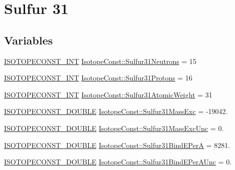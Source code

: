 \hypertarget{group___isotope_const-_sulfur-_s31}{}\section{Sulfur 31}
\label{group___isotope_const-_sulfur-_s31}
\subsection*{Variables}
\begin{DoxyCompactItemize}
\item 
\mbox{\hyperlink{group___isotope_const-_macros_ga5f18360b3e99483a35c32d789e62621c}{I\+S\+O\+T\+O\+P\+E\+C\+O\+N\+S\+T\+\_\+\+I\+NT}} \mbox{\hyperlink{group___isotope_const-_sulfur-_s31_ga2a333a718f9a0844678a067ed7ea4012}{Isotope\+Const\+::\+Sulfur31\+Neutrons}} = 15
\item 
\mbox{\hyperlink{group___isotope_const-_macros_ga5f18360b3e99483a35c32d789e62621c}{I\+S\+O\+T\+O\+P\+E\+C\+O\+N\+S\+T\+\_\+\+I\+NT}} \mbox{\hyperlink{group___isotope_const-_sulfur-_s31_ga25b464d32176264ada3a34dad01cb6b0}{Isotope\+Const\+::\+Sulfur31\+Protons}} = 16
\item 
\mbox{\hyperlink{group___isotope_const-_macros_ga5f18360b3e99483a35c32d789e62621c}{I\+S\+O\+T\+O\+P\+E\+C\+O\+N\+S\+T\+\_\+\+I\+NT}} \mbox{\hyperlink{group___isotope_const-_sulfur-_s31_ga4233eee92ca51082de80652bed9cea7c}{Isotope\+Const\+::\+Sulfur31\+Atomic\+Weight}} = 31
\item 
\mbox{\hyperlink{group___isotope_const-_macros_ga8f45a7272ce02c0b4c65c44636ed719a}{I\+S\+O\+T\+O\+P\+E\+C\+O\+N\+S\+T\+\_\+\+D\+O\+U\+B\+LE}} \mbox{\hyperlink{group___isotope_const-_sulfur-_s31_ga806d359413f8f79c21415f4daf845bae}{Isotope\+Const\+::\+Sulfur31\+Mass\+Exc}} = -\/19042.
\item 
\mbox{\hyperlink{group___isotope_const-_macros_ga8f45a7272ce02c0b4c65c44636ed719a}{I\+S\+O\+T\+O\+P\+E\+C\+O\+N\+S\+T\+\_\+\+D\+O\+U\+B\+LE}} \mbox{\hyperlink{group___isotope_const-_sulfur-_s31_gad5695e469ed8c2231f2bf86eb47c8cc0}{Isotope\+Const\+::\+Sulfur31\+Mass\+Exc\+Unc}} = 0.
\item 
\mbox{\hyperlink{group___isotope_const-_macros_ga8f45a7272ce02c0b4c65c44636ed719a}{I\+S\+O\+T\+O\+P\+E\+C\+O\+N\+S\+T\+\_\+\+D\+O\+U\+B\+LE}} \mbox{\hyperlink{group___isotope_const-_sulfur-_s31_gad4d2e30c415daebfd0806bcb099cb6e7}{Isotope\+Const\+::\+Sulfur31\+Bind\+E\+PerA}} = 8281.
\item 
\mbox{\hyperlink{group___isotope_const-_macros_ga8f45a7272ce02c0b4c65c44636ed719a}{I\+S\+O\+T\+O\+P\+E\+C\+O\+N\+S\+T\+\_\+\+D\+O\+U\+B\+LE}} \mbox{\hyperlink{group___isotope_const-_sulfur-_s31_ga2f8b8c5beb6335937932cc3ac5494a1c}{Isotope\+Const\+::\+Sulfur31\+Bind\+E\+Per\+A\+Unc}} = 0.

\end{DoxyCompactItemize}
